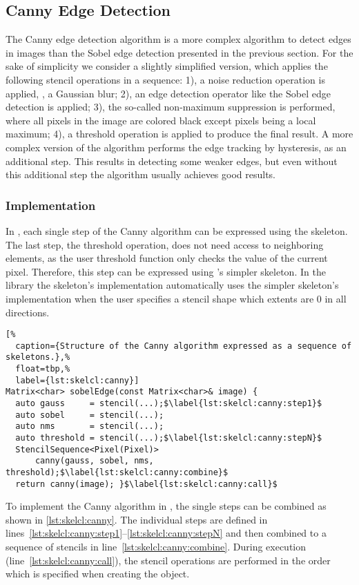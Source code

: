 \subsection{Canny Edge Detection}
The Canny edge detection algorithm is a more complex algorithm to detect edges in images than the Sobel edge detection presented in the previous section.
For the sake of simplicity we consider a slightly simplified version, which applies the following stencil operations in a sequence:
1), a noise reduction operation is applied, \eg, a Gaussian blur;
2), an edge detection operator like the Sobel edge detection is applied;
3), the so-called non-maximum suppression is performed, where all pixels in the image are colored black except pixels being a local maximum;
4), a threshold operation is applied to produce the final result.
A more complex version of the algorithm performs the edge tracking by hysteresis, as an additional step.
This results in detecting some weaker edges, but even without this additional step the algorithm usually achieves good results.


\subsubsection*{\SkelCL Implementation}
In \SkelCL, each single step of the Canny algorithm can be expressed using the \stencil skeleton.
The last step, the threshold operation, does not need access to neighboring elements, as the user threshold function only checks the value of the current pixel.
Therefore, this step can be expressed using \SkelCL's simpler \map skeleton.
In the \SkelCL library the  skeleton's implementation automatically uses the simpler \map skeleton's implementation when the user specifies a stencil shape which extents are $0$ in all directions.

\begin{lstlisting}[%
  caption={Structure of the Canny algorithm expressed as a sequence of skeletons.},%
  float=tbp,%
  label={lst:skelcl:canny}]
Matrix<char> sobelEdge(const Matrix<char>& image) {
  auto gauss     = stencil(...);$\label{lst:skelcl:canny:step1}$
  auto sobel     = stencil(...);
  auto nms       = stencil(...);
  auto threshold = stencil(...);$\label{lst:skelcl:canny:stepN}$
  StencilSequence<Pixel(Pixel)>
      canny(gauss, sobel, nms, threshold);$\label{lst:skelcl:canny:combine}$
  return canny(image); }$\label{lst:skelcl:canny:call}$
\end{lstlisting}

To implement the Canny algorithm in \SkelCL, the single steps can be combined as shown in \autoref{lst:skelcl:canny}.
The individual steps are defined in lines~\ref{lst:skelcl:canny:step1}--\ref{lst:skelcl:canny:stepN} and then combined to a sequence of stencils in line~\ref{lst:skelcl:canny:combine}.
During execution (line~\ref{lst:skelcl:canny:call}), the stencil operations are performed in the order which is specified when creating the  object.

